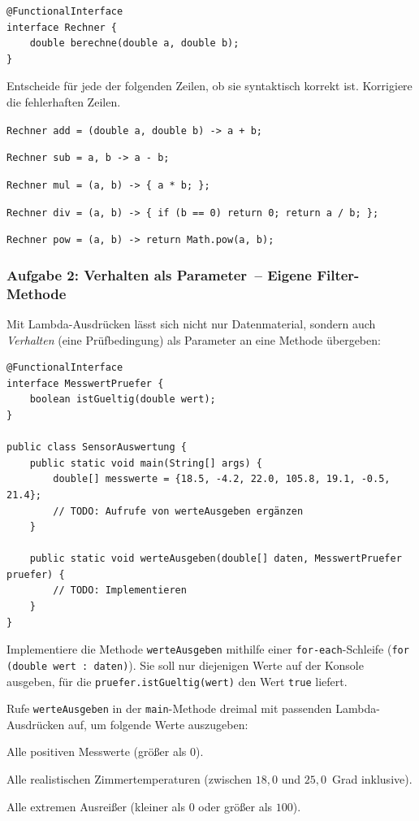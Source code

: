\begin{lstlisting}
@FunctionalInterface
interface Rechner {
    double berechne(double a, double b);
}
\end{lstlisting}

Entscheide für jede der folgenden Zeilen, ob sie syntaktisch korrekt ist.
Korrigiere die fehlerhaften Zeilen.

\begin{compactenum}[1.]
\item \lstinline|Rechner add = (double a, double b) -> a + b;|
\item \lstinline|Rechner sub = a, b -> a - b;|
\item \lstinline|Rechner mul = (a, b) -> { a * b; };|
\item \lstinline|Rechner div = (a, b) -> { if (b == 0) return 0; return a / b; };|
\item \lstinline|Rechner pow = (a, b) -> return Math.pow(a, b);|
\end{compactenum}

\subsubsection*{Aufgabe 2: \glqq Verhalten als Parameter\grqq\ -- Eigene Filter-Methode \tagZusatz \tagLK}
Mit Lambda-Ausdrücken lässt sich nicht nur Datenmaterial, sondern auch
\emph{Verhalten} (eine Prüfbedingung) als Parameter an eine Methode übergeben:

\begin{lstlisting}
@FunctionalInterface
interface MesswertPruefer {
    boolean istGueltig(double wert);
}

public class SensorAuswertung {
    public static void main(String[] args) {
        double[] messwerte = {18.5, -4.2, 22.0, 105.8, 19.1, -0.5, 21.4};
        // TODO: Aufrufe von werteAusgeben ergänzen
    }

    public static void werteAusgeben(double[] daten, MesswertPruefer pruefer) {
        // TODO: Implementieren
    }
}
\end{lstlisting}

\begin{compactenum}[a)]
\item Implementiere die Methode \lstinline|werteAusgeben| mithilfe einer
\texttt{for-each}-Schleife (\lstinline|for (double wert : daten)|). Sie soll
nur diejenigen Werte auf der Konsole ausgeben, für die
\lstinline|pruefer.istGueltig(wert)| den Wert \lstinline|true| liefert.
\item Rufe \lstinline|werteAusgeben| in der \lstinline|main|-Methode dreimal
mit passenden Lambda-Ausdrücken auf, um folgende Werte auszugeben:
\begin{compactitem}
\item Alle positiven Messwerte (größer als $0$).
\item Alle realistischen Zimmertemperaturen (zwischen $18{,}0$ und $25{,}0$~Grad inklusive).
\item Alle extremen Ausreißer (kleiner als $0$ oder größer als $100$).
\end{compactitem}
\end{compactenum}

